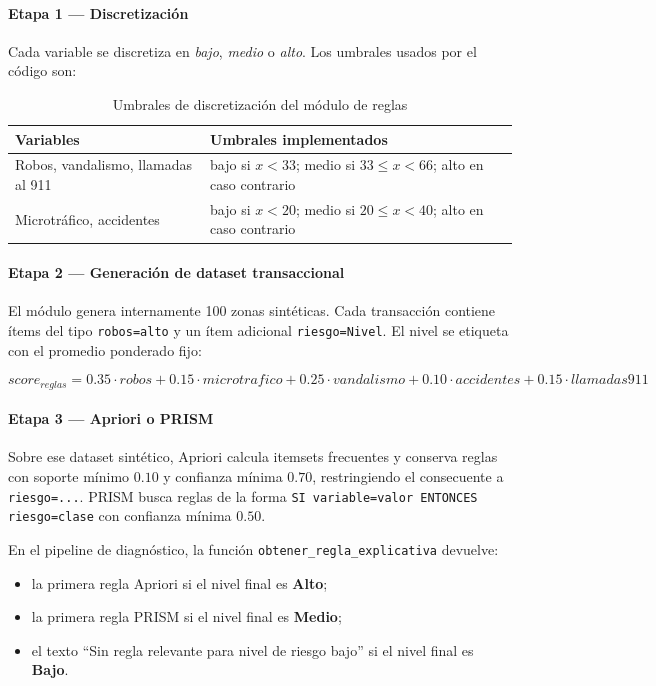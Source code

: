 \documentclass[11pt]{article}
\begin{document}
\paragraph{Etapa 1 — Discretización}

Cada variable se discretiza en \textit{bajo}, \textit{medio} o \textit{alto}. Los umbrales usados por el código son:

\begin{table}[H]
    \centering
    \begin{tabular}{lp{8cm}}
        \toprule
        \textbf{Variables} & \textbf{Umbrales implementados} \\
        \midrule
        Robos, vandalismo, llamadas al 911 & bajo si $x < 33$; medio si $33 \leq x < 66$; alto en caso contrario \\
        Microtráfico, accidentes & bajo si $x < 20$; medio si $20 \leq x < 40$; alto en caso contrario \\
        \bottomrule
    \end{tabular}
    \caption{Umbrales de discretización del módulo de reglas}
\end{table}

\paragraph{Etapa 2 — Generación de dataset transaccional}

El módulo genera internamente 100 zonas sintéticas. Cada transacción contiene ítems del tipo \texttt{robos=alto} y un ítem adicional \texttt{riesgo=Nivel}. El nivel se etiqueta con el promedio ponderado fijo:

\begin{equation}
    score_{reglas} = 0.35 \cdot robos + 0.15 \cdot microtrafico + 0.25 \cdot vandalismo + 0.10 \cdot accidentes + 0.15 \cdot llamadas911
\end{equation}

\paragraph{Etapa 3 — Apriori o PRISM}

Sobre ese dataset sintético, Apriori calcula itemsets frecuentes y conserva reglas con soporte mínimo $0.10$ y confianza mínima $0.70$, restringiendo el consecuente a \texttt{riesgo=...}. PRISM busca reglas de la forma \texttt{SI variable=valor ENTONCES riesgo=clase} con confianza mínima $0.50$.

En el pipeline de diagnóstico, la función \texttt{obtener\_regla\_explicativa} devuelve:
\begin{itemize}
    \item la primera regla Apriori si el nivel final es \textbf{Alto};
    \item la primera regla PRISM si el nivel final es \textbf{Medio};
    \item el texto ``Sin regla relevante para nivel de riesgo bajo'' si el nivel final es \textbf{Bajo}.
\end{itemize}
\end{document}
